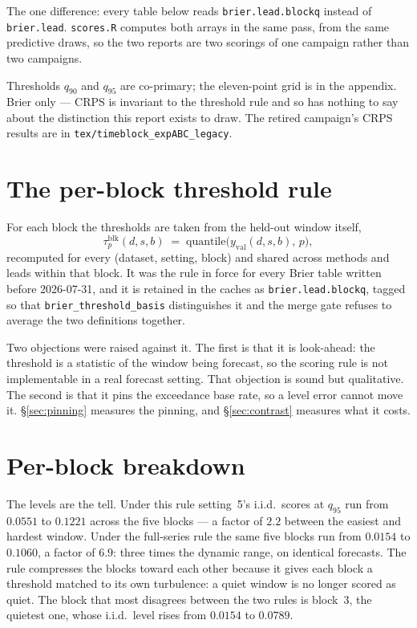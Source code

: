 \documentclass[11pt]{article}
\newcommand{\code}[1]{\texttt{#1}}
\newcommand{\tblpath}{../../code/analysis/time_block_forecast/simstudy/output/tables}
\newcommand{\tbl}[1]{}
\begin{document}
The one difference: every table below reads \code{brier.lead.blockq}
instead of \code{brier.lead}. \code{scores.R} computes both arrays in the
same pass, from the same predictive draws, so the two reports are two
scorings of one campaign rather than two campaigns.

Thresholds $q_{90}$ and $q_{95}$ are co-primary; the eleven-point grid is
in the appendix. Brier only --- CRPS is invariant to the threshold rule
and so has nothing to say about the distinction this report exists to
draw. The retired campaign's CRPS results are in
\code{tex/timeblock\_expABC\_legacy}.

\section{The per-block threshold rule}

For each block the thresholds are taken from the held-out window itself,
\[
  \tau_p^{\mathrm{blk}}(d,s,b)
  \;=\; \mathrm{quantile}\bigl(y_{\mathrm{val}}(d,s,b),\,p\bigr),
\]
recomputed for every (dataset, setting, block) and shared across methods
and leads within that block. It was the rule in force for every Brier
table written before 2026-07-31, and it is retained in the caches as
\code{brier.lead.blockq}, tagged so that
\code{brier\_threshold\_basis} distinguishes it and the merge gate
refuses to average the two definitions together.

Two objections were raised against it. The first is that it is
look-ahead: the threshold is a statistic of the window being forecast, so
the scoring rule is not implementable in a real forecast setting. That
objection is sound but qualitative. The second is that it pins the
exceedance base rate, so a level error cannot move it.
\S\ref{sec:pinning} measures the pinning, and \S\ref{sec:contrast}
measures what it costs.

\section{Per-block breakdown}

\tbl{expA_block_blockq}

\noindent The levels are the tell. Under this rule setting~5's i.i.d.\
scores at $q_{95}$ run from $0.0551$ to $0.1221$ across the five blocks
--- a factor of $2.2$ between the easiest and hardest window. Under the
full-series rule the same five blocks run from $0.0154$ to $0.1060$, a
factor of $6.9$: three times the dynamic range, on identical forecasts.
The rule compresses the
blocks toward each other because it gives each block a threshold matched
to its own turbulence: a quiet window is no longer scored as quiet. The
block that most disagrees between the two rules is block~3, the quietest
one, whose i.i.d.\ level rises from $0.0154$ to $0.0789$.
\end{document}
